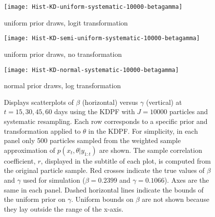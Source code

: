 \documentclass[useAMS,referee,usenatbib]{biom}
\begin{document}
\begin{figure}

\begin{minipage}{1.0\linewidth}
\texttt{[image: Hist-KD-uniform-systematic-10000-betagamma]}
\vspace{-1.0cm}
\begin{center}
uniform prior draws, logit transformation
\end{center}
\end{minipage}

\vspace{0.5cm}

\begin{minipage}{1.0\linewidth}
\texttt{[image: Hist-KD-semi-uniform-systematic-10000-betagamma]}
\vspace{-1.0cm}
\begin{center}
uniform prior draws, no transformation
\end{center}
\end{minipage}

\vspace{0.5cm}

\begin{minipage}{1.0\linewidth}
\texttt{[image: Hist-KD-normal-systematic-10000-betagamma]}
\vspace{-1.0cm}
\begin{center}
normal prior draws, log transformation
\end{center}
\end{minipage}

\caption{Displays scatterplots of $\beta$ (horizontal) versus $\gamma$ (vertical) at $t = 15, 30, 45, 60$ days using the KDPF with $J = 10000$ particles and systematic resampling.  Each row corresponds to a specific prior and transformation applied to $\theta$ in the KDPF.  For simplicity, in each panel only 500 particles sampled from the weighted sample approximation of $p(x_t,\theta|y_{1:t})$ are shown.  The sample correlation coefficient, $r$, displayed in the subtitle of each plot, is computed from the original particle sample.  Red crosses indicate the true values of $\beta$ and $\gamma$ used for simulation ($\beta = 0.2399$ and $\gamma = 0.1066$).  Axes are the same in each panel.  Dashed horizontal lines indicate the bounds of the uniform prior on $\gamma$.  Uniform bounds on $\beta$ are not shown because they lay outside the range of the x-axis.} \label{fig:priors}

\end{figure}
\end{document}
